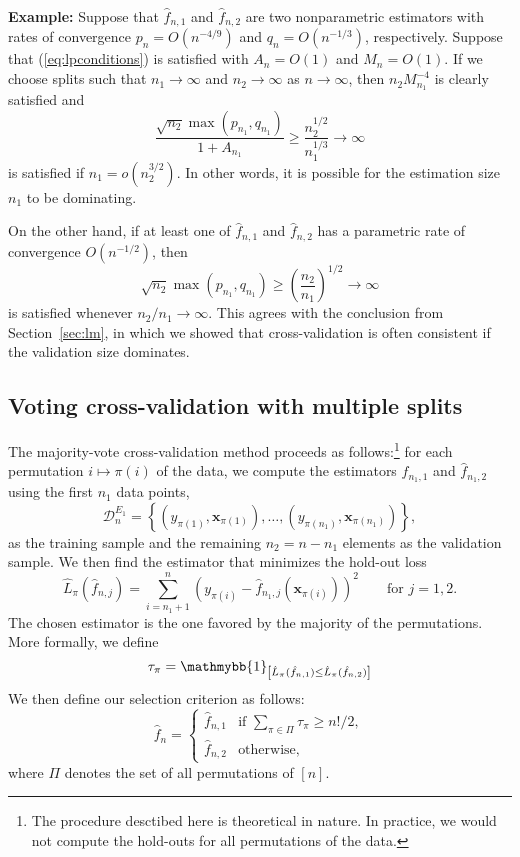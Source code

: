 \documentclass[11pt, letter paper]{article}
\newcommand{\1}{\mathmybb{1}}
\newcommand{\0}{\emptyset}
\newcommand{\paren}[1]{\left(#1 \right)}
\newcommand{\sqbr}[1]{\left[#1 \right]}
\newcommand{\set}[1]{\left\{ #1 \right\}}
\newcommand{\ind}[1]{\mathmybb{1}_{\sqbr{#1}}}
\newcommand{\data}{\mathcal{D}_{n}}
\newcommand{\x}{\boldsymbol{x}}
\newcommand{\fhat}[2]{\hat{f}_{#1, #2}}
\begin{document}
\begin{myproofbox}
    \textbf{Example: } Suppose that \(\fhat{n}{1}\) and \(\fhat{n}{2}\) are two nonparametric estimators with rates of convergence \(p_{n}=O\paren{n^{-4/9}}\) and \(q_{n}=O\paren{n^{-1/3}}\), respectively. Suppose that (\ref{eq:lpconditions}) is satisfied with \(A_{n} = O(1)\) and \(M_{n}=O(1)\). If we choose splits such that \(n_{1}\to\infty\) and \(n_{2}\to\infty\) as \(n\to\infty\), then \(n_{2}M_{n_{1}}^{-4}\) is clearly satisfied and 
    \[\frac{\sqrt{n_{2}}\max(p_{n_{1}}, q_{n_{1}})}{1+A_{n_{1}}} \geq \frac{n_{2}^{1/2}}{n_{1}^{1/3}}\to\infty \]
    is satisfied if \(n_{1}=o\paren{n_{2}^{3/2}}\). In other words, it is possible for the estimation size \(n_{1}\) to be dominating.

    On the other hand, if at least one of \(\fhat{n}{1}\) and \(\fhat{n}{2}\) has a parametric rate of convergence \(O(n^{-1/2})\), then
    \[\sqrt{n_{2}}\max(p_{n_{1}},q_{n_{1}})\geq \paren{\frac{n_{2}}{n_{1}}}^{1/2}\to\infty\]
    is satisfied whenever \(n_{2}/n_{1}\to\infty\). This agrees with the conclusion from Section~\ref{sec:lm}, in which we showed that cross-validation is often consistent if the validation size dominates.
\end{myproofbox}

\subsection{Voting cross-validation with multiple splits}

The majority-vote cross-validation method proceeds as follows:\footnote{The procedure desctibed here is theoretical in nature. In practice, we would not compute the hold-outs for all permutations of the data.} for each permutation \(i\mapsto\pi(i)\) of the data, we compute the estimators \(\fhat{n_{1}}{1}\) and \(\fhat{n_{1}}{2}\) using the first \(n_{1}\) data points,
\[\data^{E_{1}} = \set{\paren{y_{\pi(1)}, \x_{\pi(1)}}, \ldots,\paren{y_{\pi(n_1)}, \x_{\pi(n_1)}}},\]
as the training sample and the remaining \(n_{2}=n-n_{1}\) elements as the validation sample. We then find the estimator that minimizes the hold-out loss
\[\hat{L}_{\pi}(\fhat{n}{j}) = \sum_{i=n_{1}+1}^{n}\paren{y_{\pi(i)} - \fhat{n_{1}}{j}\paren{\x_{\pi(i)}}}^{2}\qquad \text{for }j=1,2.\]
The chosen estimator is the one favored by the majority of the permutations. More formally, we define 
\[\tau_{\pi} = \ind{\hat{L}_{\pi}(\fhat{n}{1}) \leq \hat{L}_{\pi}(\fhat{n}{2})}\]
We then define our selection criterion as follows:
\[\hat{f}_{n} = \begin{cases}
    \fhat{n}{1} &\text{if }\sum_{\pi\in\Pi}\tau_{\pi} \geq {n!}/{2},\\[2mm]
    \fhat{n}{2} &\text{otherwise,}
\end{cases}\]
where \(\Pi\) denotes the set of all permutations of \([n]\).
\end{document}
